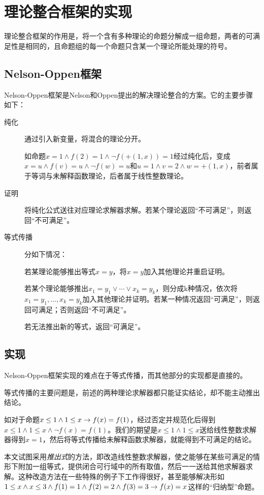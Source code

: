 \chapter{理论整合框架的实现}
\label{chap:no}

理论整合框架的作用是，将一个含有多种理论的命题分解成一组命题，两者的可满足性是相同的，且命题组的每一个命题只含某一个理论所能处理的符号。

\section{Nelson-Oppen框架}
Nelson-Oppen框架\cite{Nelson:1979:SCD:357073.357079}是Nelson和Oppen提出的解决理论整合的方案。它的主要步骤如下：
\begin{description}
  \item[纯化] 通过引入新变量，将混合的理论分开。

    如命题$x = 1 \land f(2) = 1 \land \lnot f(+(1,x))=1$经过纯化后，变成$x = u \land f(v) = u \land \lnot f(w)=u$和$u = 1 \land v = 2 \land w = +(1, x)$，前者属于等词与未解释函数理论，后者属于线性整数理论。
  \item[证明] 将纯化公式送往对应理论求解器求解。若某个理论返回``不可满足''，则返回``不可满足''。
  \item[等式传播] 分如下情况：

    若某理论能够推出等式$x = y$，将$x = y$加入其他理论并重启证明。

    若某个理论能够推出$x_1 = y_1 \lor \cdots \lor x_k = y_k$，则分成k种情况，依次将$x_1 = y_1, \dots, x_k = y_k$加入其他理论并证明。若某一种情况返回``可满足''，则返回可满足；否则返回``不可满足''。

    若无法推出新的等式，返回``可满足''。
\end{description}

\section{实现}
Nelson-Oppen框架实现的难点在于等式传播，而其他部分的实现都是直接的。

等式传播的主要问题是，前述的两种理论求解器都只能证实结论，却不能主动推出结论。

如对于命题$x \leq 1 \land 1 \leq x \rightarrow f(x) = f(1)$，经过否定并规范化后得到$x \leq 1 \land 1 \leq x \land \lnot f(x) = f(1)$。我们的期望是$x \leq 1 \land 1 \leq x$送给线性整数求解器得到$x=1$，然后将等式传播给未解释函数求解器，就能得到不可满足的结论。

本文试图采用\emph{推出式}的方法，即改造线性整数求解器，使之能够在某些可满足的情形下附加一组等式，提供闭合可行域中的所有取值，然后一一送给其他求解器求解。这种改造方法在一些特殊的例子下工作得很好，甚至能够解决形如$1 \leq x \land x \leq 3 \land f(1)=1 \land f(2)=2 \land f(3)=3 \rightarrow f(x)=x$这样的``归纳型''命题。

